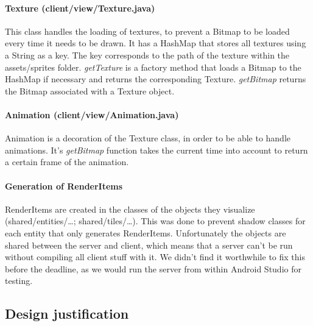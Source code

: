 \documentclass[../main.tex]{subfiles}
\begin{document}
			\paragraph{Texture (\tiny client/view/Texture.java\normalsize)} This class handles the loading of textures, to prevent a Bitmap to be loaded every time it needs to be drawn. It has a HashMap that stores all textures using a String as a key. The key corresponds to the path of the texture within the assets/sprites folder. \textit{getTexture} is a factory method that loads a Bitmap to the HashMap if necessary and returns the corresponding Texture. \textit{getBitmap} returns the Bitmap associated with a Texture object.

			\paragraph{Animation (\tiny client/view/Animation.java\normalsize)} Animation is a decoration of the Texture class, in order to be able to handle animations. It's \textit{getBitmap} function takes the current time into account to return a certain frame of the animation.

			\paragraph{Generation of RenderItems} RenderItems are created in the classes of the objects they visualize (\tiny shared/entities/\dots; shared/tiles/\dots\normalsize). This was done to prevent shadow classes for each entity that only generates RenderItems. Unfortunately the objects are shared between the server and client, which means that a server can't be run without compiling all client stuff with it. We didn't find it worthwhile to fix this before the deadline, as we would run the server from within Android Studio for testing. 
	\subsection{Design justification}
\end{document}
